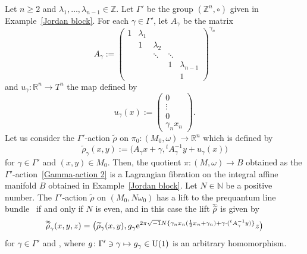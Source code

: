 \documentclass[10pt,a4paper]{amsart}
\numberwithin{equation}{section}
\newcommand{\C}{\mathbb{C}}
\newcommand{\R}{\mathbb{R}}
\newcommand{\Z}{\mathbb{Z}}
\newcommand{\N}{\mathbb{N}}
\renewcommand{\tilde}{\widetilde}
\newcommand{\vardbtilde}[1]{\tilde{\raisebox{0pt}[0.85\height]{$\tilde{#1}$}}}
\begin{document}
\begin{Example}\label{Jordan block2}
Let $n\ge 2$ and $\lambda_1,\ldots, \lambda_{n-1}\in \Z$. Let $\Gamma'$ be the group $(\Z^n,\circ )$ given in Example~\ref{Jordan block}. For each $\gamma\in \Gamma'$, let $A_\gamma$ be the matrix
\[
A_\gamma:=
\begin{pmatrix}
1 & \lambda_1 & & & \\
 & 1 & \lambda_2 & & \\
 & & \ddots & \ddots & \\
 & & & 1 & \lambda_{n-1}\\
 & & & & 1
\end{pmatrix}^{\gamma_n}
\]
and $u_\gamma\colon \R^n\to T^n$ the map defined by
\[
u_\gamma (x):=
\begin{pmatrix}
0 \\
\vdots \\
0 \\
\gamma_nx_n
\end{pmatrix}.
\]
Let us consider the $\Gamma'$-action ${\tilde\rho}$ on $\pi_0\colon ( M_0,\omega)\to \R^n$ which is defined by
\begin{equation}\label{Gamma-action 2}
{\tilde \rho}_\gamma (x,y):=\bigl( A_\gamma x+\gamma , {}^tA_\gamma^{-1}y+u_\gamma (x)\bigr)
\end{equation}
for $\gamma\in \Gamma'$ and $(x,y)\in M_0$. Then, the quotient $\pi\colon (M,\omega)\to B$ obtained as the $\Gamma'$-action~\eqref{Gamma-action 2} is a Lagrangian fibration on the integral affine manifold $B$ obtained in Example~\ref{Jordan block}.
%
Let ${N\in \N}$ be a positive number. The $\Gamma'$-action ${\tilde \rho}$ on $(M_0, N\omega_0)$ has a lift to the prequantum line bundle~ if and only if $N$ is even, and in this case the lift ${\vardbtilde \rho}$ is given by
\[
{\vardbtilde \rho}_\gamma (x,y,z)=\bigl({\tilde \rho}_\gamma (x,y), g_\gamma {\rm e}^{2\pi\sqrt{-1}N\{ \gamma_n x_n(\frac{1}{2}x_n+\gamma_n)+\gamma\cdot ({}^tA_\gamma^{-1}y)\}}z\bigr)
\]
for $\gamma\in \Gamma'$ and \smash{$(x,y,z)\in L_0^{\otimes N}\cong \R^n\times T^n\times \C$}, where $g\colon \Gamma' \ni \gamma\mapsto g_\gamma\in {\rm U}(1)$ is an arbitrary homomorphism.
\end{Example}
\end{document}
